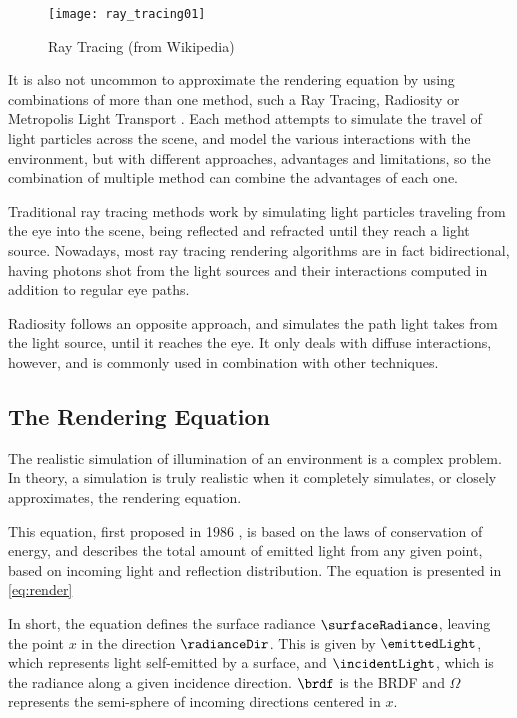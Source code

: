 \documentclass[main.tex]{subfiles}
\begin{document}
\begin{figure}[!htp]
  \centering
  \texttt{[image: ray\_tracing01]}
  \caption[Ray Tracing]{Ray Tracing (from Wikipedia)}
  \label{fig:ray_tracing}
\end{figure}

It is also not uncommon to approximate the rendering equation by using combinations of more than one method, such a Ray Tracing, Radiosity or Metropolis Light Transport \cite{wallace1987two,veach1997metropolis}. Each method attempts to simulate the travel of light particles across the scene, and model the various interactions with the environment, but with different approaches, advantages and limitations, so the combination of multiple method can combine the advantages of each one.

Traditional ray tracing methods work by simulating light particles traveling from the eye into the scene, being reflected and refracted until they reach a light source. Nowadays, most ray tracing rendering algorithms are in fact bidirectional, having photons shot from the light sources and their interactions computed in addition to regular eye paths.

Radiosity follows an opposite approach, and simulates the path light takes from the light source, until it reaches the eye. It only deals with diffuse interactions, however, and is commonly used in combination with other techniques.


\subsection{The Rendering Equation}

The realistic simulation of illumination of an environment is a complex problem. In theory, a simulation is truly realistic when it completely simulates, or closely approximates, the rendering equation.

This equation, first proposed in 1986 \cite{kajiya1986rendering}, is based on the laws of conservation of energy, and describes the total amount of emitted light from any given point, based on incoming light and reflection distribution. The equation is presented in \cref{eq:render}


In short, the equation defines the surface radiance $\surfaceRadiance$, leaving the point $x$ in the direction $\radianceDir$. This is given by $\emittedLight$, which represents light self-emitted by a surface, and $\incidentLight$, which is the radiance along a given incidence direction. $\brdf$ is the \acf{BRDF} and $\Omega$ represents the semi-sphere of incoming directions centered in $x$.
\end{document}
